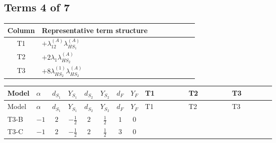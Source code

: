 \documentclass[8pt]{article}
\begin{document}
\begin{landscape}
\subsection*{Terms 4 of 7}
\begin{center}
\begin{tabular}{@{}c >{\raggedright\arraybackslash}p{0.82\linewidth}@{}}
\toprule
Column & Representative term structure \\
\midrule
T1 & \(\displaystyle +{\lambda_{12}^{(A)}} {\lambda_{HS_1}^{(A)}}\) \\
\midrule
T2 & \(\displaystyle +2 {\lambda_1} {\lambda_{HS_2}^{(A)}}\) \\
\midrule
T3 & \(\displaystyle +8 {\lambda_{HS_2}^{(1)}} {\lambda_{HS_2}^{(A)}}\) \\
\midrule
\bottomrule
\end{tabular}
\end{center}
\smallskip
\tiny
\begin{longtable}{@{}llcccccc >{\raggedright\arraybackslash}p{0.21\linewidth} >{\raggedright\arraybackslash}p{0.21\linewidth} >{\raggedright\arraybackslash}p{0.21\linewidth}@{}}
\toprule
Model & $\alpha$ & $d_{S_1}$ & $Y_{S_1}$ & $d_{S_2}$ & $Y_{S_2}$ & $d_F$ & $Y_F$ & T1 & T2 & T3 \\
\midrule
\endfirsthead
\toprule
Model & $\alpha$ & $d_{S_1}$ & $Y_{S_1}$ & $d_{S_2}$ & $Y_{S_2}$ & $d_F$ & $Y_F$ & T1 & T2 & T3 \\
\midrule
\endhead
T3-B & $-1$ & $2$ & $-\frac{1}{2}$ & $2$ & $\frac{1}{2}$ & $1$ & $0$ & \scriptsize\adjustbox{max width=\linewidth}{$\begin{gathered} +{\lambda_{12}^{(A)}} {\lambda_{HS_1}^{(A)}}\end{gathered}$} & \scriptsize\adjustbox{max width=\linewidth}{$\begin{gathered} +2 {\lambda_1} {\lambda_{HS_2}^{(A)}}\end{gathered}$} & \scriptsize\adjustbox{max width=\linewidth}{$\begin{gathered} +8 {\lambda_{HS_2}^{(1)}} {\lambda_{HS_2}^{(A)}}\end{gathered}$} \\
\midrule
T3-C & $-1$ & $2$ & $-\frac{1}{2}$ & $2$ & $\frac{1}{2}$ & $3$ & $0$ & \scriptsize\adjustbox{max width=\linewidth}{$\begin{gathered} +{\lambda_{12}^{(A)}} {\lambda_{HS_1}^{(A)}}\end{gathered}$} & \scriptsize\adjustbox{max width=\linewidth}{$\begin{gathered} +2 {\lambda_1} {\lambda_{HS_2}^{(A)}}\end{gathered}$} & \scriptsize\adjustbox{max width=\linewidth}{$\begin{gathered} +8 {\lambda_{HS_2}^{(1)}} {\lambda_{HS_2}^{(A)}}\end{gathered}$} \\

\end{longtable}
\end{landscape}
\end{document}
